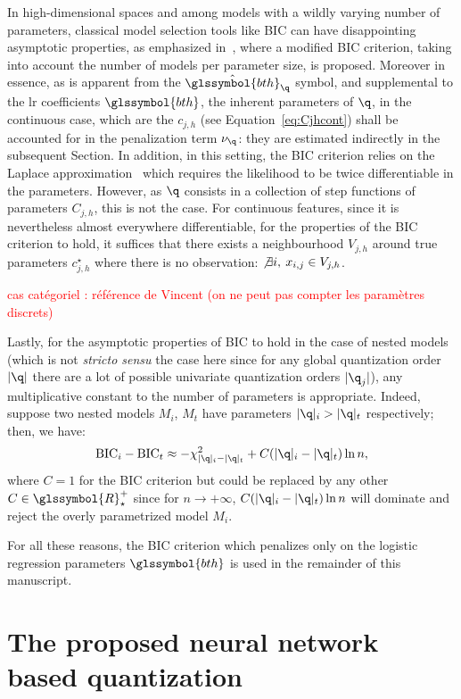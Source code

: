 In high-dimensional spaces and among models with a wildly varying number of parameters, classical model selection tools like BIC can have disappointing asymptotic properties, as emphasized in~\cite{chen2008extended}, where a modified BIC criterion, taking into account the number of models per parameter size, is proposed.
Moreover in essence, as is apparent from the $\hat{\glssymbol{bth}}_\q$ symbol, and supplemental to the \gls{lr} coefficients $\glssymbol{bth}$, the inherent parameters of $\q$, in the continuous case, which are the $c_{j,h}$ (see Equation~\eqref{eq:Cjhcont}) shall be accounted for in the penalization term $\nu_\q$: they are estimated indirectly in the subsequent Section.
In addition, in this setting, the BIC criterion relies on the Laplace approximation~\cite{lebarbier} which requires the likelihood to be twice differentiable in the parameters. However, as $\q$ consists in a collection of step functions of parameters $C_{j,h}$, this is not the case. For continuous features, since it is nevertheless almost everywhere differentiable, for the properties of the BIC criterion to hold, it suffices that there exists a neighbourhood $V_{j,h}$ around true parameters $c_{j,h}^\star$ where there is no observation: $\not\exists i, \: x_{i,j} \in V_{j,h}$.

\textcolor{red}{cas catégoriel : référence de Vincent (on ne peut pas compter les paramètres discrets)}

Lastly, for the asymptotic properties of BIC to hold in the case of nested models (which is not \textit{stricto sensu} the case here since for any global quantization order $|\q|$ there are a lot of possible univariate quantization orders $|\q_j|$), any multiplicative constant to the number of parameters is appropriate. Indeed, suppose two nested models $M_i$, $M_t$ have parameters $|\q|_i > |\q|_t$ respectively; then, we have:
\[ \text{BIC}_i - \text{BIC}_t \approx - \chi^2_{|\q|_i - |\q|_t} + C(|\q|_i - |\q|_t)\ln n, \]
where $C=1$ for the BIC criterion but could be replaced by any other $C \in \glssymbol{R}^+_\star$ since for $n \to + \infty$, $C(|\q|_i - |\q|_t)\ln n$ will dominate and reject the overly parametrized model $M_i$.

For all these reasons, the BIC criterion which penalizes only on the logistic regression parameters $\glssymbol{bth}$ is used in the remainder of this manuscript.

\section{The proposed neural network based quantization}
\label{sec:proposal}

